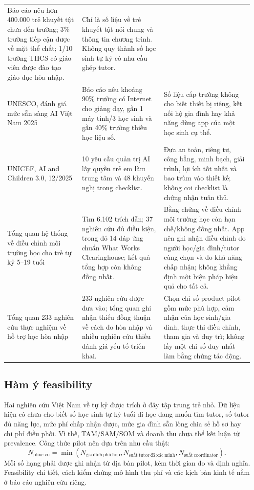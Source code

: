 \documentclass[11pt,a4paper]{article}
\begin{document}
\begin{longtable}{p{3.0cm}p{5.4cm}p{6.3cm}}
Báo cáo nêu hơn 400.000 trẻ khuyết tật chưa đến trường; 3\% trường tiếp cận được về mặt thể chất; 1/10 trường THCS có giáo viên được đào tạo giáo dục hòa nhập. &
Chỉ là số liệu về trẻ khuyết tật nói chung và thông tin chương trình. Không quy thành số học sinh tự kỷ có nhu cầu ghép tutor. \\
\addlinespace
UNESCO, đánh giá mức sẵn sàng AI Việt Nam 2025 \cite{unescoai2025} &
Báo cáo nêu khoảng 90\% trường có Internet cho giảng dạy, gần 1 máy tính/3 học sinh và gần 40\% trường thiếu học liệu số. &
Số liệu cấp trường không cho biết thiết bị riêng, kết nối hộ gia đình hay khả năng dùng app của một học sinh cụ thể. \\
\addlinespace
UNICEF, AI and Children 3.0, 12/2025 \cite{unicefai2025} &
10 yêu cầu quản trị AI lấy quyền trẻ em làm trung tâm và 48 khuyến nghị trong checklist. &
Đưa an toàn, riêng tư, công bằng, minh bạch, giải trình, lợi ích tốt nhất và bao trùm vào thiết kế; không coi checklist là chứng nhận tuân thủ. \\
\addlinespace
Tổng quan hệ thống về điều chỉnh môi trường học cho trẻ tự kỷ 5--19 tuổi \cite{accommodation2020} &
Tìm 6.102 trích dẫn; 37 nghiên cứu đủ điều kiện, trong đó 14 đáp ứng chuẩn What Works Clearinghouse; kết quả tổng hợp còn không đồng nhất. &
Bằng chứng về điều chỉnh môi trường học còn hạn chế/không đồng nhất. App nên ghi nhận điều chỉnh do người học/gia đình/tutor cùng chọn và đo khả năng chấp nhận; không khẳng định một biện pháp hiệu quả cho tất cả. \\
\addlinespace
Tổng quan 233 nghiên cứu thực nghiệm về hỗ trợ học hòa nhập \cite{perrelet2025} &
233 nghiên cứu được đưa vào; tổng quan ghi nhận thiếu đồng thuận về cách đo hòa nhập và nhiều nghiên cứu thiếu đánh giá yếu tố triển khai. &
Chọn chỉ số product pilot gồm mức phù hợp, cảm nhận của học sinh/gia đình, thực thi điều chỉnh, tham gia và duy trì; không lấy một chỉ số duy nhất làm bằng chứng tác động. \\
\bottomrule
\end{longtable}

\subsection{Hàm ý feasibility}
Hai nghiên cứu Việt Nam về tự kỷ được trích ở đây tập trung trẻ nhỏ. Dữ liệu hiện có chưa cho biết số học sinh tự kỷ tuổi đi học đang muốn tìm tutor, số tutor đủ năng lực, mức phí chấp nhận được, mức gia đình sẵn lòng chia sẻ hồ sơ hay chi phí điều phối. Vì thế, TAM/SAM/SOM và doanh thu chưa thể kết luận từ prevalence. Công thức pilot nên dựa trên nhu cầu thật:
\[
N_{\mathrm{phục\ vụ}}=\min(N_{\mathrm{gia\ đình\ phù\ hợp}},N_{\mathrm{suất\ tutor\ đã\ xác\ minh}},N_{\mathrm{suất\ coordinator}}).
\]
Mỗi số hạng phải được ghi nhận từ địa bàn pilot, kèm thời gian đo và định nghĩa. Feasibility chi tiết, cách kiểm chứng mô hình thu phí và các kịch bản kinh tế nằm ở báo cáo nghiên cứu riêng.
\end{document}
